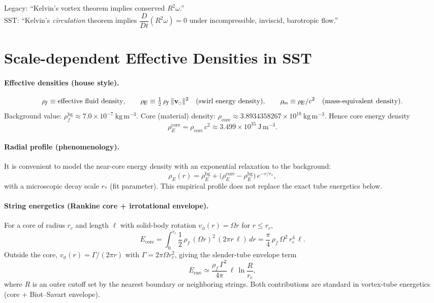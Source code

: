 \documentclass[11pt]{article}
\newcommand{\swirlarrow}{%
	\mathchoice{\mkern-2mu\scriptstyle\boldsymbol{\circlearrowleft}}%
	{\mkern-2mu\scriptstyle\boldsymbol{\circlearrowleft}}%
	{\mkern-2mu\scriptscriptstyle\boldsymbol{\circlearrowleft}}%
	{\mkern-2mu\scriptscriptstyle\boldsymbol{\circlearrowleft}}%
}
\newcommand{\vswirl}{\mathbf{v}_{\swirlarrow}}
\newcommand{\vnorm}{\lVert \vswirl \rVert}               %
\newcommand{\rhoF}{\rho_{\!f}}                           %
\newcommand{\rhoE}{\rho_{\!E}}                           %
\newcommand{\rhoM}{\rho_{\!m}}                           %
\newcommand{\rhoC}{\rho_{\mathrm{core}}} %
\begin{document}
		Legacy: “Kelvin’s vortex theorem implies conserved $R^2\omega$.”\\
		SST: “Kelvin’s \emph{circulation} theorem implies $\dfrac{D}{Dt}(R^2\omega)=0$ under incompressible, inviscid, barotropic flow.”



	\section*{Scale-dependent Effective Densities in SST}
		\paragraph{Effective densities (house style).}
		\[
			\rhoF \equiv \text{effective fluid density},\qquad
			\rhoE \equiv \tfrac12\,\rhoF\,\vnorm^{2}\quad(\text{swirl energy density}),\qquad
			\rhoM \equiv \rhoE/c^{2}\quad(\text{mass-equivalent density}).
		\]
		Background value: $\rhoF^{\mathrm{bg}}\approx 7.0\times 10^{-7}\ \mathrm{kg\,m^{-3}}$.
		Core (material) density: $\rhoC\approx 3.8934358267\times 10^{18}\ \mathrm{kg\,m^{-3}}$.
		Hence core energy density
		\[
			\rhoE^{\text{core}}=\rhoC\,c^{2}\approx 3.499\times 10^{35}\ \mathrm{J\,m^{-3}}.
		\]

		\paragraph{Radial profile (phenomenology).}
		It is convenient to model the near-core energy density with an exponential relaxation to the background:
		\[
			\rhoE(r)=\rhoE^{\mathrm{bg}}+\bigl(\rhoE^{\text{core}}-\rhoE^{\mathrm{bg}}\bigr)\,e^{-r/r_\ast},
		\]
		with a microscopic decay scale $r_\ast$ (fit parameter). This empirical profile does not replace the exact tube energetics below.

		\paragraph{String energetics (Rankine core + irrotational envelope).}
		For a core of radius $r_c$ and length $\ell$ with solid-body rotation $v_\phi(r)=\Omega r$ for $r\le r_c$,
		\[
			E_{\text{core}}
			=\int_{0}^{r_c}\!\!\frac12\,\rhoF\,(\Omega r)^2\,(2\pi r\,\ell)\,dr
			=\frac{\pi}{4}\,\rhoF\,\Omega^2\,r_c^4\,\ell.
		\]
		Outside the core, $v_\phi(r)=\Gamma/(2\pi r)$ with $\Gamma=2\pi\Omega r_c^{2}$, giving the slender-tube envelope term
		\[
			E_{\text{env}}\simeq \frac{\rhoF\,\Gamma^2}{4\pi}\,\ell\,\ln\!\frac{R}{r_c},
		\]
		where $R$ is an outer cutoff set by the nearest boundary or neighboring strings. Both contributions are standard in vortex-tube energetics (core + Biot–Savart envelope).
\end{document}
